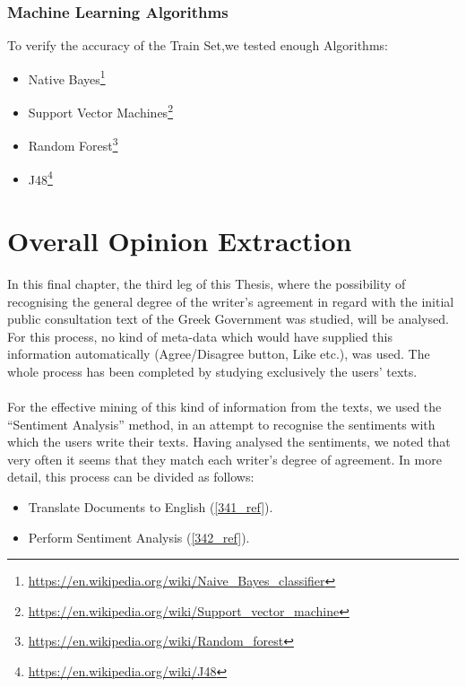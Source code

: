 \subsubsection{Machine Learning Algorithms}\label{3353_ref}
To verify the accuracy of the Train Set,we tested enough Algorithms:\\

\begin{itemize}

		\item Native Bayes\footnote{\url{https://en.wikipedia.org/wiki/Naive_Bayes_classifier}}
	\item Support Vector Machines\footnote{\url{https://en.wikipedia.org/wiki/Support_vector_machine}}
	\item Random Forest\footnote{\url{https://en.wikipedia.org/wiki/Random_forest}}
	\item J48\footnote{\url{https://en.wikipedia.org/wiki/J48}}

\end{itemize}

\section{Overall Opinion Extraction}\label{34_ref}
In this final chapter, the third leg of this Thesis, where the possibility of recognising the general degree of the writer's agreement in regard with the initial public consultation text of the Greek Government was studied, will be analysed. For this process, no kind of meta-data which would have supplied this information automatically (Agree/Disagree button, Like etc.), was used. The whole process has been completed by studying exclusively the users' texts.\\
\\
For the effective mining of this kind of information from the texts, we used the ``Sentiment Analysis'' method, in an attempt to recognise the sentiments with which the users write their texts. Having analysed the sentiments, we noted that very often it seems that they match each writer's degree of agreement. In more detail, this process can be divided as follows:\\
\begin{itemize}

	\item Translate Documents to English (\ref{341_ref}).
	\item Perform Sentiment Analysis  (\ref{342_ref}).

\end{itemize}
